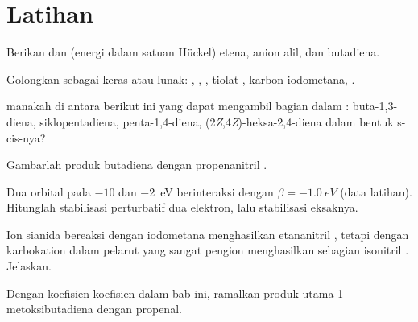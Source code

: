 \section{Latihan}

\begin{exercise}[$\star$]\label{exo:b2:frontier-orbitals:1}
Berikan  dan  (energi dalam satuan Hückel) etena, anion alil, dan
butadiena.
\end{exercise}

\begin{exercise}[$\star$]\label{exo:b2:frontier-orbitals:2}
Golongkan sebagai keras atau lunak: , , , tiolat
, karbon iodometana, .
\end{exercise}

\begin{exercise}[$\star$]\label{exo:b2:frontier-orbitals:3}
 manakah di antara berikut ini yang dapat mengambil bagian dalam
: buta-1,3-diena, siklopentadiena, penta-1,4-diena,
(2\textit{Z},4\textit{Z})-heksa-2,4-diena dalam bentuk s-cis-nya?
\end{exercise}

\begin{exercise}[$\star$]\label{exo:b2:frontier-orbitals:4}
Gambarlah produk butadiena dengan propenanitril .
\end{exercise}

\begin{exercise}[$\star\star$]\label{exo:b2:frontier-orbitals:5}
Dua orbital pada $-10$ dan \qty{-2}{eV} berinteraksi dengan
$\beta = \qty{-1.0}{eV}$ (data latihan). Hitunglah stabilisasi perturbatif
dua elektron, lalu stabilisasi eksaknya.
\end{exercise}

\begin{exercise}[$\star\star$]\label{exo:b2:frontier-orbitals:6}
Ion sianida bereaksi dengan iodometana menghasilkan etananitril
, tetapi dengan karbokation dalam pelarut yang sangat pengion
menghasilkan sebagian isonitril . Jelaskan.
\end{exercise}

\begin{exercise}[$\star\star$]\label{exo:b2:frontier-orbitals:7}
Dengan koefisien-koefisien dalam bab ini, ramalkan produk utama
1-metoksibutadiena dengan propenal.
\end{exercise}

